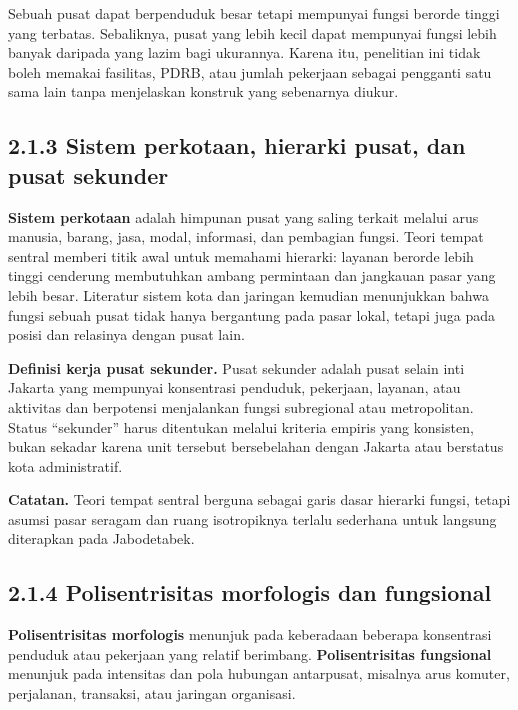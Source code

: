 \documentclass[
  indonesian,
  11pt,
  a4paper,
  oneside,
  openany]{report}
\begin{document}
Sebuah pusat dapat berpenduduk besar tetapi mempunyai fungsi berorde
tinggi yang terbatas. Sebaliknya, pusat yang lebih kecil dapat mempunyai
fungsi lebih banyak daripada yang lazim bagi ukurannya. Karena itu,
penelitian ini tidak boleh memakai fasilitas, PDRB, atau jumlah
pekerjaan sebagai pengganti satu sama lain tanpa menjelaskan konstruk
yang sebenarnya diukur.

\subsection{2.1.3 Sistem perkotaan, hierarki pusat, dan pusat
sekunder}\label{sistem-perkotaan-hierarki-pusat-dan-pusat-sekunder}

\textbf{Sistem perkotaan} adalah himpunan pusat yang saling terkait
melalui arus manusia, barang, jasa, modal, informasi, dan pembagian
fungsi. Teori tempat sentral memberi titik awal untuk memahami hierarki:
layanan berorde lebih tinggi cenderung membutuhkan ambang permintaan dan
jangkauan pasar yang lebih besar. Literatur sistem kota dan jaringan
kemudian menunjukkan bahwa fungsi sebuah pusat tidak hanya bergantung
pada pasar lokal, tetapi juga pada posisi dan relasinya dengan pusat
lain.

\textbf{Definisi kerja pusat sekunder.} Pusat sekunder adalah pusat
selain inti Jakarta yang mempunyai konsentrasi penduduk, pekerjaan,
layanan, atau aktivitas dan berpotensi menjalankan fungsi subregional
atau metropolitan. Status ``sekunder'' harus ditentukan melalui kriteria
empiris yang konsisten, bukan sekadar karena unit tersebut bersebelahan
dengan Jakarta atau berstatus kota administratif.

\textbf{Catatan.} Teori tempat sentral berguna sebagai garis dasar
hierarki fungsi, tetapi asumsi pasar seragam dan ruang isotropiknya
terlalu sederhana untuk langsung diterapkan pada Jabodetabek.

\subsection{2.1.4 Polisentrisitas morfologis dan
fungsional}\label{polisentrisitas-morfologis-dan-fungsional}

\textbf{Polisentrisitas morfologis} menunjuk pada keberadaan beberapa
konsentrasi penduduk atau pekerjaan yang relatif berimbang.
\textbf{Polisentrisitas fungsional} menunjuk pada intensitas dan pola
hubungan antarpusat, misalnya arus komuter, perjalanan, transaksi, atau
jaringan organisasi.
\end{document}
